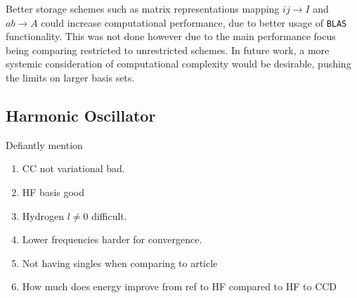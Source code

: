 Better storage schemes such as matrix representations mapping $ij \rightarrow I$ and $ab \rightarrow A$ could increase computational performance, due to better usage of \verb|BLAS| functionality. This was not done however due to the main performance focus being comparing restricted to unrestricted schemes. In future work, a more systemic consideration of computational complexity would be desirable, pushing the limits on larger basis sets.

\subsection{Harmonic Oscillator}
Defiantly mention
\begin{enumerate}
    \item CC not variational bad.
    \item HF basis good
    \item Hydrogen $l \neq 0$ difficult.
    \item Lower frequencies harder for convergence.
    \item Not having singles when comparing to article
    \item How much does energy improve from ref to HF compared to HF to CCD
\end{enumerate} 


